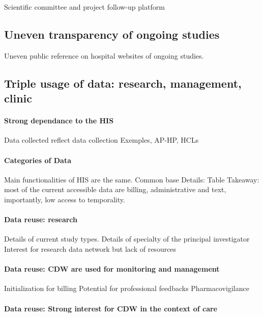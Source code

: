 \documentclass{report}
\begin{document}
Scientific committee and project follow-up platform

\subsection{Uneven transparency of ongoing
  studies}\label{subsec:cdw:results:transparency} Uneven public reference on
hospital websites of ongoing studies.

\subsection{Triple usage of data: research, management,
  clinic}\label{subsec:cdw:results:data}

\paragraph{Strong dependance to the HIS}

Data collected reflect data collection
Exemples, AP-HP, HCLs

\paragraph{Categories of Data}

Main functionalities of HIS are the same. Common base Details: Table Takeaway:
most of the current accessible data are billing, administrative and text,
importantly, low access to temporality.

\paragraph{Data reuse: research}
Details of current study types.
Details of specialty of the principal investigator
Interest for research data network but lack of resources

\paragraph{Data reuse: CDW are used for monitoring and management}
Initialization for billing
Potential for professional feedbacks
Pharmacovigilance

\paragraph{Data reuse: Strong interest for CDW in the context of care}
\end{document}
